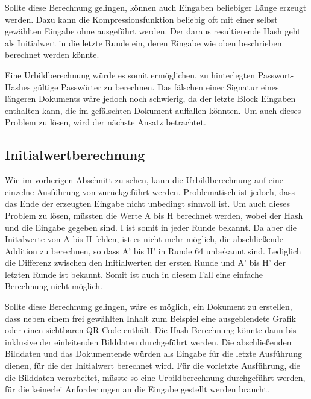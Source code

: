 Sollte diese Berechnung gelingen, können auch Eingaben beliebiger Länge erzeugt werden. Dazu kann die Kompressionsfunktion beliebig oft mit einer selbst gewählten Eingabe
ohne  ausgeführt werden. Der daraus resultierende Hash geht als Initialwert in die letzte Runde ein, deren Eingabe wie oben beschrieben berechnet werden könnte.

Eine Urbildberechnung würde es somit ermöglichen, zu hinterlegten Passwort-Hashes gültige Passwörter zu berechnen. Das fälschen einer Signatur eines längeren Dokuments
wäre jedoch noch schwierig, da der letzte Block Eingaben enthalten kann, die im gefälschten Dokument auffallen könnten. Um auch dieses Problem zu lösen, wird der nächste
Ansatz betrachtet.

\subsection{Initialwertberechnung}
\label{sec:initialwertberechnung}
Wie im vorherigen Abschnitt zu sehen, kann die Urbildberechnung auf eine einzelne Ausführung von  zurückgeführt werden.
Problematisch ist jedoch, dass das Ende der erzeugten Eingabe nicht unbedingt sinnvoll ist. Um auch dieses Problem zu lösen, müssten
die Werte A bis H berechnet werden, wobei der Hash und die Eingabe gegeben sind. I ist somit in jeder Runde bekannt. Da aber die Initalwerte
von A bis H fehlen, ist es nicht mehr möglich, die abschließende Addition zu berechnen, so dass A' bis H' in Runde 64 unbekannt sind. Lediglich
die Differenz zwischen den Initialwerten der ersten Runde und A' bis H' der letzten Runde ist bekannt. Somit ist auch in diesem Fall eine
einfache Berechnung nicht möglich.

Sollte diese Berechnung gelingen, wäre es möglich, ein Dokument zu erstellen, dass neben einem frei gewählten Inhalt zum Beispiel eine ausgeblendete
Grafik oder einen sichtbaren QR-Code enthält. Die Hash-Berechnung könnte dann bis inklusive der einleitenden Bilddaten durchgeführt werden.
Die abschließenden Bilddaten und das Dokumentende würden als Eingabe für die letzte Ausführung dienen, für die der Initialwert berechnet wird.
Für die vorletzte Ausführung, die die Bilddaten verarbeitet, müsste so eine Urbildberechnung durchgeführt werden, für die keinerlei Anforderungen
an die Eingabe gestellt werden braucht.

